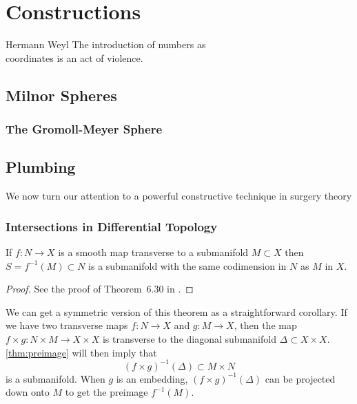 \chapter{Constructions}\label{chap:constructions}

\begin{epigraph}{14em}{Hermann Weyl}
  The introduction of numbers as \\
  coordinates is an act of violence.
\end{epigraph}

\section{Milnor Spheres}\label{sec:milnor-spheres}
\cite{milnor1956manifolds}

\subsection{The Gromoll-Meyer Sphere}\label{sec:gromoll-meyer}
\cite{gromollmeyer1974curvature}

\section{Plumbing}\label{sec:plumbing}

We now turn our attention to a powerful constructive technique in surgery theory 


\subsection{Intersections in Differential Topology}\label{sec:differential-topology-intersections}

\begin{theorem}\label{thm:preimage}
	If $f : N \to X$ is a smooth map transverse to a submanifold $M\subset X$ then $S=f^{-1}(M)\subset N$ is a submanifold with the same codimension in $N$ as $M$ in $X$.
\end{theorem}
\begin{proof}
	See the proof of Theorem~6.30 in \cite{lee2013smooth}.
\end{proof}

\begin{remark}\label{rmk:symmetric-preimage-theorem}
	We can get a symmetric version of this theorem as a straightforward corollary. If we have two transverse maps $f : N\to X$ and $g : M\to X$, then the map $f\times g : N\times M \to X\times X$ is transverse to the diagonal submanifold $\Delta\subset X\times X$. \cref{thm:preimage} will then imply that
	\[
		(f\times g)^{-1}(\Delta) \subset M\times N
	\]
	is a submanifold. When $g$ is an embedding, $(f\times g)^{-1}(\Delta)$ can be projected down onto $M$ to get the preimage $f^{-1}(M)$.
\end{remark}

